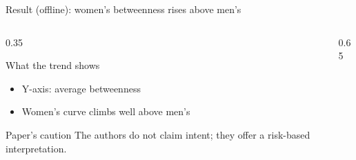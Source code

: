 \begin{frame}{Result (offline): women's betweenness rises above men's}
  \small
  \begin{columns}[T,onlytextwidth]
    \begin{column}{0.35\textwidth}
      \begin{block}{What the trend shows}
        \begin{itemize}
          \item Y-axis: average betweenness
          \item Women's curve climbs well above men's
        \end{itemize}
      \end{block}

      \begin{exampleblock}{Paper's caution}
        The authors do not claim intent; they offer a risk-based interpretation.
      \end{exampleblock}
    \end{column}

    \begin{column}{0.65\textwidth}
    \end{column}
  \end{columns}

\end{frame}

